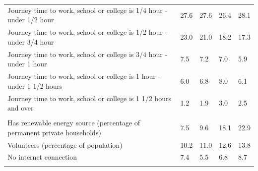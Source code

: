 \documentclass{article}
\begin{document}
\begin{table}[h]
\begin{tabular}{KTTTT}
Journey time to work, school or college is 1/4 hour - under 1/2 hour & 27.6& 27.6& 26.4& 28.1\\
Journey time to work, school or college is 1/2 hour - under 3/4 hour & 23.0& 21.0& 18.2& 17.3\\
Journey time to work, school or college is 3/4 hour - under 1 hour & 7.5& 7.2& 7.0& 5.9\\
Journey time to work, school or college is 1 hour - under 1 1/2 hours & 6.0& 6.8& 8.0& 6.1\\
Journey time to work, school or college is 1 1/2 hours and over & 1.2& 1.9& 3.0& 2.5\\
\hline
    \\ 
    \hline
Has renewable energy source (percentage of permanent private households) &  7.5&  9.6& 18.1& 22.9\\
    \hline
Volunteers (percentage of population) & 10.2& 11.0& 12.6& 13.8\\
    \hline
No internet connection& 7.4& 5.5& 6.8& 8.7\\
\hline
\end{tabular}
\end{table}
\end{document}
